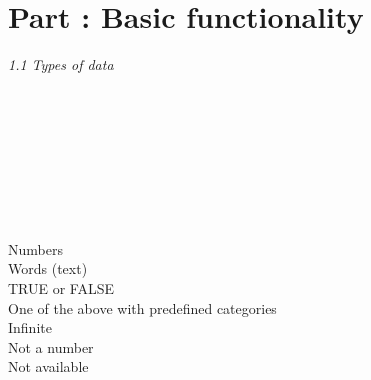 \section{Part : Basic functionality}

\textit{1.1 Types of data} \\
\\
\begin{minipage}[t]{.4\textwidth}
\vspace*{-8pt}
 \\
 \\
 \\
 \\ 			
 \\					
 \\ 					 
\end{minipage}
\begin{minipage}[t]{.6\textwidth}
Numbers \\
Words (text) \\
TRUE or FALSE \\
One of the above with predefined categories \\
Infinite \\
Not a number \\
Not available
\end{minipage}
\vspace*{.5cm}

